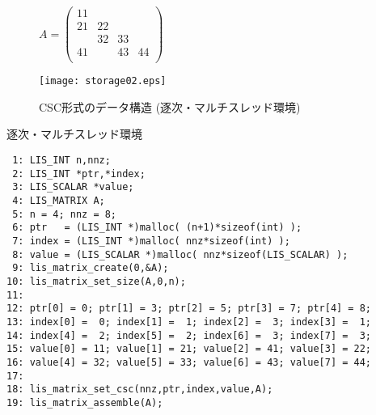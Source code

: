 \documentclass[a4paper]{jarticle}
\begin{document}
{{\begin{figure}[h]
{\centering 
\begin{minipage}{0.3\textwidth}
\begin{flushright}
$ 
A = \left(
\begin{array}{cccc}
11 &    &    &    \\
21 & 22 &    &    \\
   & 32 & 33 &    \\
41 &    & 43 & 44 \\
\end{array}\right)
$
\end{flushright}
\end{minipage}
\begin{minipage}{0.6\textwidth}
\begin{flushleft}
\texttt{[image: storage02.eps]} 
\end{flushleft}
\end{minipage}
\caption{CSC形式のデータ構造 (逐次・マルチスレッド環境)}\label{fig:storage02}}
\end{figure}
\begin{itembox}[l]{逐次・マルチスレッド環境}
\small
\begin{verbatim}
 1: LIS_INT n,nnz;
 2: LIS_INT *ptr,*index;
 3: LIS_SCALAR *value;
 4: LIS_MATRIX A;
 5: n = 4; nnz = 8;
 6: ptr   = (LIS_INT *)malloc( (n+1)*sizeof(int) );
 7: index = (LIS_INT *)malloc( nnz*sizeof(int) );
 8: value = (LIS_SCALAR *)malloc( nnz*sizeof(LIS_SCALAR) );
 9: lis_matrix_create(0,&A);
10: lis_matrix_set_size(A,0,n);
11:
12: ptr[0] = 0; ptr[1] = 3; ptr[2] = 5; ptr[3] = 7; ptr[4] = 8;
13: index[0] =  0; index[1] =  1; index[2] =  3; index[3] =  1;
14: index[4] =  2; index[5] =  2; index[6] =  3; index[7] =  3;
15: value[0] = 11; value[1] = 21; value[2] = 41; value[3] = 22;
16: value[4] = 32; value[5] = 33; value[6] = 43; value[7] = 44;
17:
18: lis_matrix_set_csc(nnz,ptr,index,value,A);
19: lis_matrix_assemble(A);
\end{verbatim}
\end{itembox}

\newpage
}}
\end{document}
